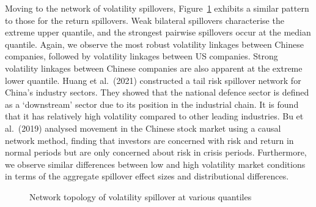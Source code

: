 \documentclass[
  letterpaper,
  DIV=11,
  numbers=noendperiod]{scrartcl}
\begin{document}
Moving to the network of volatility spillovers, Figure~\ref{fig-vol}
exhibits a similar pattern to those for the return spillovers. Weak
bilateral spillovers characterise the extreme upper quantile, and the
strongest pairwise spillovers occur at the median quantile. Again, we
observe the most robust volatility linkages between Chinese companies,
followed by volatility linkages between US companies. Strong volatility
linkages between Chinese companies are also apparent at the extreme
lower quantile. Huang et al.~(2021) constructed a tail risk spillover
network for China's industry sectors. They showed that the national
defence sector is defined as a `downstream' sector due to its position
in the industrial chain. It is found that it has relatively high
volatility compared to other leading industries. Bu et al.~(2019)
analysed movement in the Chinese stock market using a causal network
method, finding that investors are concerned with risk and return in
normal periods but are only concerned about risk in crisis periods.
Furthermore, we observe similar differences between low and high
volatility market conditions in terms of the aggregate spillover effect
sizes and distributional differences.

\begin{figure}[H]

\begin{minipage}[t]{0.50\linewidth}

{\centering 


}

\end{minipage}%
%
\begin{minipage}[t]{0.50\linewidth}

{\centering 


}

\end{minipage}%
\newline
\begin{minipage}[t]{\linewidth}

{\centering 


}

\end{minipage}%

\caption{\label{fig-vol}Network topology of volatility spillover at
various quantiles}

\end{figure}
\end{document}
